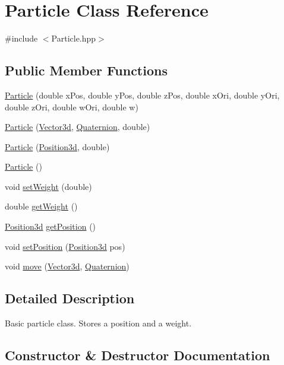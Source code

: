 \hypertarget{classParticle}{}\section{Particle Class Reference}
\label{classParticle}


{\ttfamily \#include $<$Particle.\+hpp$>$}

\subsection*{Public Member Functions}
\begin{DoxyCompactItemize}
\item 
\hyperlink{classParticle_afbf844a997934d306fe689dbb9a24569}{Particle} (double x\+Pos, double y\+Pos, double z\+Pos, double x\+Ori, double y\+Ori, double z\+Ori, double w\+Ori, double w)
\item 
\hyperlink{classParticle_a86d9fbc48a99f8d87e3e9cb2a300a826}{Particle} (\hyperlink{structVector3d}{Vector3d}, \hyperlink{structQuaternion}{Quaternion}, double)
\item 
\hyperlink{classParticle_ad2efee7bc1b494a931904465e1f00dd4}{Particle} (\hyperlink{classPosition3d}{Position3d}, double)
\item 
\hyperlink{classParticle_a40f4c7e248029d72e7714b7802d5e5e1}{Particle} ()
\item 
void \hyperlink{classParticle_a0aea1cf9a6dec45251a6c55586a7a6cc}{set\+Weight} (double)
\item 
double \hyperlink{classParticle_aa3394c6311c1a7d9a431d20ed565c297}{get\+Weight} ()
\item 
\hyperlink{classPosition3d}{Position3d} \hyperlink{classParticle_a804a757870822ba5d437310665cc0a0f}{get\+Position} ()
\item 
void \hyperlink{classParticle_a46c4e13f7e8d88e9747ba8ef1f974bbe}{set\+Position} (\hyperlink{classPosition3d}{Position3d} pos)
\item 
void \hyperlink{classParticle_a9bf0972f96de472f015c1812ae8e269d}{move} (\hyperlink{structVector3d}{Vector3d}, \hyperlink{structQuaternion}{Quaternion})
\end{DoxyCompactItemize}


\subsection{Detailed Description}
Basic particle class. Stores a position and a weight. 

\subsection{Constructor \& Destructor Documentation}
\mbox{\label{classParticle_afbf844a997934d306fe689dbb9a24569}} 
